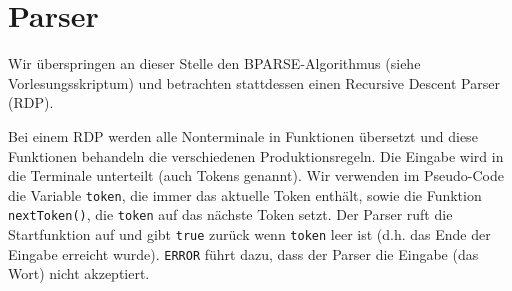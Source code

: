 \section{Parser}\label{subsec:parser}
Wir überspringen an dieser Stelle den BPARSE-Algorithmus (siehe Vorlesungsskriptum) und betrachten stattdessen
einen Recursive Descent Parser (RDP).

Bei einem RDP werden alle Nonterminale in Funktionen übersetzt und diese Funktionen behandeln die verschiedenen Produktionsregeln.
Die Eingabe wird in die Terminale unterteilt (auch Tokens genannt).
Wir verwenden im Pseudo-Code die Variable \verb|token|, die immer das aktuelle Token enthält, sowie die Funktion \verb|nextToken()|, die \verb|token| auf das nächste Token setzt.
Der Parser ruft die Startfunktion auf und gibt \verb|true| zurück wenn \verb|token| leer ist (d.h. das Ende der Eingabe erreicht wurde). \verb|ERROR| führt dazu, dass der Parser die Eingabe (das Wort) nicht akzeptiert.

